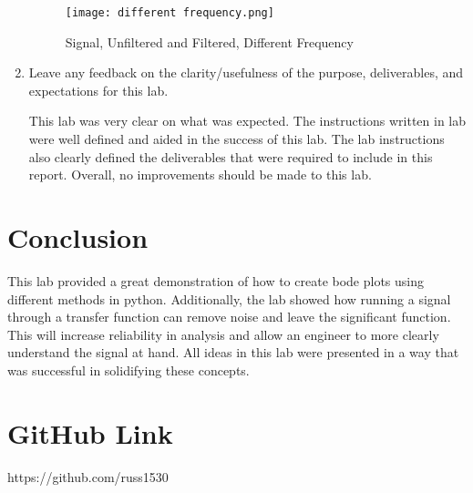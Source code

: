 \documentclass[12pt, titlepage]{article}
\begin{document}
\begin{enumerate}
                \begin{figure}[h!]
                    \centering
                    \texttt{[image: different frequency.png]}
                    \caption{Signal, Unfiltered and Filtered, Different Frequency}
                    \label{fig:my_label}
                \end{figure}
        
        \item Leave any feedback on the clarity/usefulness of the purpose, deliverables, and expectations for this lab.
        
        This lab was very clear on what was expected. The instructions written in lab were well defined and aided in the success of this lab. The lab instructions also clearly defined the deliverables that were required to include in this report. Overall, no improvements should be made to this lab.
        
    \end{enumerate}
    
       
    \clearpage
    \section{Conclusion}
    
    This lab provided a great demonstration of how to create bode plots using different methods in python.  Additionally, the lab showed how running a signal through a transfer function can remove noise and leave the significant function.  This will increase reliability in analysis and allow an engineer to more clearly understand the signal at hand.  All ideas in this lab were presented in a way that was successful in solidifying these concepts.
    
    
    \section{GitHub Link}
        https://github.com/russ1530
\end{document}
